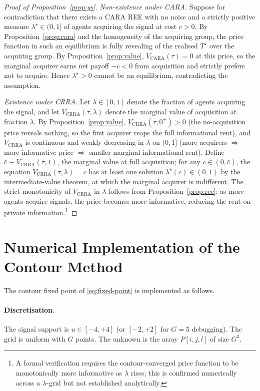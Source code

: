 \documentclass[12pt,letterpaper]{article}
\theoremstyle{definition}
\theoremstyle{remark}
\newcommand{\Tstar}{T^{\!\star}}
\newcommand{\1}{\mathbf{1}}
\begin{document}
\begin{proof}[Proof of Proposition~\ref{prop:gs}]
\emph{Non-existence under CARA.} Suppose for contradiction that there
exists a CARA REE with no noise and a strictly positive measure
$\lambda^{\star}\in(0,1]$ of agents acquiring the signal at cost $c>0$.
By Proposition~\ref{prop:cara} and the homogeneity of the acquiring
group, the price function in such an equilibrium is fully revealing of
the realised $\Tstar$ over the acquiring group. By
Proposition~\ref{prop:value}, $V_{\mathrm{CARA}}(\tau)=0$ at this price,
so the marginal acquirer earns net payoff $-c<0$ from acquisition and
strictly prefers not to acquire. Hence $\lambda^{\star}>0$ cannot be an
equilibrium, contradicting the assumption.

\emph{Existence under CRRA.} Let $\lambda\in[0,1]$ denote the fraction of
agents acquiring the signal, and let $V_{\mathrm{CRRA}}(\tau,\lambda)$ denote
the marginal value of acquisition at fraction $\lambda$. By
Proposition~\ref{prop:value}, $V_{\mathrm{CRRA}}(\tau,0^{+})>0$ (the
no-acquisition price reveals nothing, so the first acquirer reaps the
full informational rent), and $V_{\mathrm{CRRA}}$ is continuous and weakly
decreasing in $\lambda$ on $(0,1]$ (more acquirers $\Rightarrow$ more
informative price $\Rightarrow$ smaller marginal informational rent).
Define $\bar c\equiv V_{\mathrm{CRRA}}(\tau,1)$, the marginal value at
full acquisition; for any $c\in(0,\bar c)$, the equation
$V_{\mathrm{CRRA}}(\tau,\lambda)=c$ has at least one solution
$\lambda^{\star}(c)\in(0,1)$ by the intermediate-value theorem, at which
the marginal acquirer is indifferent. The strict monotonicity of
$V_{\mathrm{CRRA}}$ in $\lambda$ follows from
Proposition~\ref{prop:ree}: as more agents acquire signals, the price
becomes more informative, reducing the rent on private
information.\footnote{A formal verification requires the
contour-converged price function to be monotonically more informative as
$\lambda$ rises; this is confirmed numerically across a $\lambda$-grid
but not established analytically.}
\end{proof}

\section{Numerical Implementation of the Contour Method}\label{app:contour}\label{app:numerics}

The contour fixed point of \eqref{eq:fixed-point} is implemented as follows.

\paragraph{Discretisation.} The signal support is $u\in[-4,+4]$ (or $[-2,+2]$
for $G=5$ debugging). The grid is uniform with $G$ points. The unknown is
the array $P[i,j,l]$ of size $G^{3}$.
\end{document}
